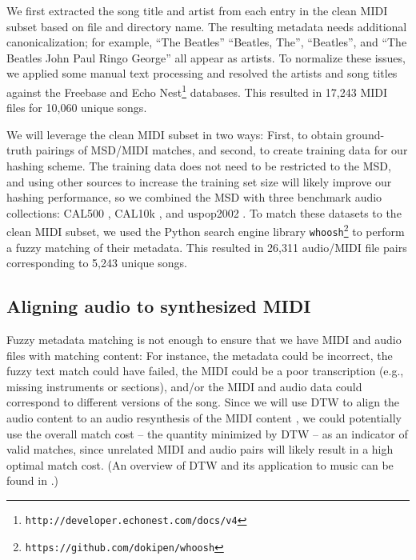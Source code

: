 \documentclass{article}
\begin{document}
We first extracted the song title and artist from each entry in the clean MIDI subset based on file and directory name.
The resulting metadata needs additional canonicalization; for example, ``The Beatles'' ``Beatles, The'', ``Beatles'', and ``The Beatles John Paul Ringo George'' all appear as artists.
To normalize these issues, we applied some manual text processing and resolved the artists and song titles against the Freebase \cite{bollacker2008freebase} and Echo Nest\footnote{\texttt{http://developer.echonest.com/docs/v4}} databases.
This resulted in 17,243 MIDI files for 10,060 unique songs.

We will leverage the clean MIDI subset in two ways: First, to obtain ground-truth pairings of MSD/MIDI matches, and second, to create training data for our hashing scheme.  
The training data does not need to be restricted to the MSD, and using other sources to increase the training set size will likely improve our hashing performance, so we combined the MSD with three benchmark audio collections: CAL500 \cite{turnbull2007towards}, CAL10k \cite{tingle2010exploring}, and uspop2002 \cite{berenzweig2004large}.
To match these datasets to the clean MIDI subset, we used the Python search engine library \texttt{whoosh}\footnote{\texttt{https://github.com/dokipen/whoosh}} to perform a fuzzy matching of their metadata.
This resulted in 26,311 audio/MIDI file pairs corresponding to 5,243 unique songs.

\subsection{Aligning audio to synthesized MIDI}
\label{sec:alignment}

Fuzzy metadata matching is not enough to ensure that we have MIDI and audio files with matching content: For instance, the metadata could be incorrect, the fuzzy text match could have failed, the MIDI could be a poor transcription (e.g., missing instruments or sections), and/or the MIDI and audio data could correspond to different versions of the song.
Since we will use DTW to align the audio content to an audio resynthesis of the MIDI content \cite{turetsky2003ground, hu2003polyphonic,ewert2012towards}, we could potentially use the overall match cost -- the quantity minimized by DTW -- as an indicator of valid matches, since unrelated MIDI and audio pairs will likely result in a high optimal match cost.  (An overview of DTW and its application to music can be found in \cite{muller2007information}.)
\end{document}
